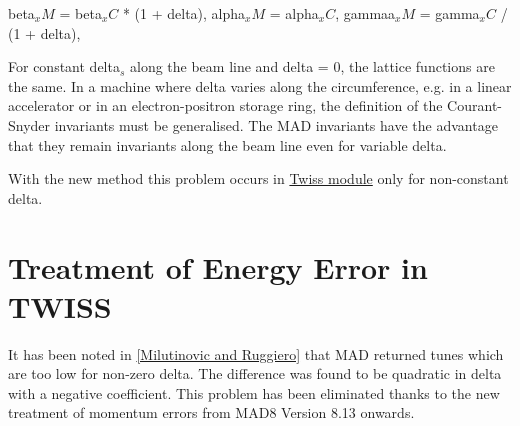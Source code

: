 beta$_\textit{x}M$ = beta$_\textit{x}C$ * (1 + delta),
alpha$_\textit{x}M$ = alpha$_\textit{x}C$, gammaa$_\textit{x}M$ =
gamma$_\textit{x}C$ / (1 + delta),  

For constant delta$_\textit{s}$ along the beam line and delta = 0, the
lattice functions are the same. In a machine where delta varies along
the circumference, e.g. in a linear accelerator or in an
electron-positron storage ring, the definition of the Courant-Snyder
invariants must be generalised. The MAD invariants have the advantage
that they remain invariants along the beam line even for variable delta.  

With the new method this problem occurs in
\href{../twiss/twiss.html}{Twiss module} only for non-constant delta.   

\section{Treatment of Energy Error in TWISS} 
It has been noted in \href{bibliography.html#ruggiero}{[Milutinovic and
    Ruggiero]} that MAD returned tunes which are too low for non-zero
delta. The difference was found to be quadratic in delta with a negative
coefficient. This problem has been eliminated thanks to the new
treatment  of momentum errors from MAD8 Version 8.13 onwards.   


